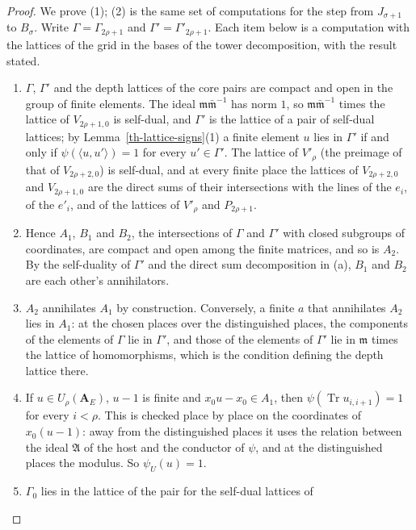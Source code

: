 \begin{proof}
We prove (1); (2) is the same set of computations for the step from
$J_{\sigma+1}$ to $B_\sigma$. Write $\Gamma=\Gamma_{2\rho+1}$ and
$\Gamma'=\Gamma'_{2\rho+1}$. Each item below is a computation with the lattices
of the grid in the bases of the tower decomposition, with the result stated.
\begin{enumerate}
\item[(a)] $\Gamma$, $\Gamma'$ and the depth lattices of the core pairs are compact
  and open in the group of finite elements. The ideal
  $\mathfrak m\bar{\mathfrak m}^{-1}$ has norm $1$, so $\mathfrak m\bar{\mathfrak m}^{-1}$
  times the lattice of $V_{2\rho+1,0}$ is self-dual, and $\Gamma'$ is the lattice
  of a pair of self-dual lattices; by Lemma~\ref{th-lattice-signs}(1) a finite
  element $u$ lies in $\Gamma'$ if and only if $\psi(\langle u,u'\rangle)=1$ for
  every $u'\in\Gamma'$. The lattice of $V'_\rho$ (the preimage of that of
  $V_{2\rho+2,0}$) is self-dual, and at every finite place the lattices of
  $V_{2\rho+2,0}$ and $V_{2\rho+1,0}$ are the direct sums of their intersections
  with the lines of the $e_i$, of the $e'_i$, and of the lattices of $V'_\rho$ and
  $P_{2\rho+1}$.
\item[(b)] Hence $A_1$, $B_1$ and $B_2$, the intersections of $\Gamma$ and
  $\Gamma'$ with closed subgroups of coordinates, are compact and open among the
  finite matrices, and so is $A_2$. By the self-duality of $\Gamma'$ and the
  direct sum decomposition in (a), $B_1$ and $B_2$ are each other's annihilators.
\item[(c)] $A_2$ annihilates $A_1$ by construction. Conversely, a finite $a$ that
  annihilates $A_2$ lies in $A_1$: at the chosen places over the distinguished
  places, the components of the elements of $\Gamma$ lie in $\Gamma'$, and those
  of the elements of $\Gamma'$ lie in $\mathfrak m$ times the lattice of
  homomorphisms, which is the condition defining the depth lattice there.
\item[(d)] If $u\in U_\rho(\mathbf A_E)$, $u-1$ is finite and $x_0u-x_0\in A_1$,
  then $\psi(\operatorname{Tr}u_{i,i+1})=1$ for every $i<\rho$. This is checked
  place by place on the coordinates of $x_0(u-1)$: away from the distinguished
  places it uses the relation between the ideal $\mathfrak A$ of the host and the
  conductor of $\psi$, and at the distinguished places the modulus. So
  $\psi_U(u)=1$.
\item[(e)] $\Gamma_0$ lies in the lattice of the pair for the self-dual lattices of

\end{enumerate}
\end{proof}
